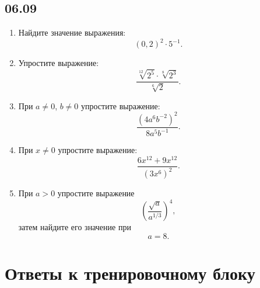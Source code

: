 \documentclass[a4paper,12pt]{article}
\begin{document}
\subsection{06.09}

\begin{enumerate}[label=\textbf{\arabic*.}]
  \item Найдите значение выражения:
  \[
  (0{,}2)^2\cdot5^{-1}.
  \]

  \item Упростите выражение:
  \[
  \frac{
    \sqrt[12]{2^5}\cdot\sqrt[8]{2^3}
  }{
    \sqrt[6]{2}
  }.
  \]

  \item При \(a\neq0\), \(b\neq0\) упростите выражение:
  \[
  \frac{
    (4a^6b^{-2})^2
  }{
    8a^5b^{-1}
  }.
  \]

  \item При \(x\neq0\) упростите выражение:
  \[
  \frac{
    6x^{12}+9x^{12}
  }{
    (3x^6)^2
  }.
  \]

  \item При \(a>0\) упростите выражение
  \[
  \left(
    \frac{\sqrt a}{a^{1/3}}
  \right)^4,
  \]
  затем найдите его значение при
  \[
  a=8.
  \]
\end{enumerate}

\clearpage

\section{Ответы к тренировочному блоку}

\renewcommand{\arraystretch}{1.35}
\end{document}
